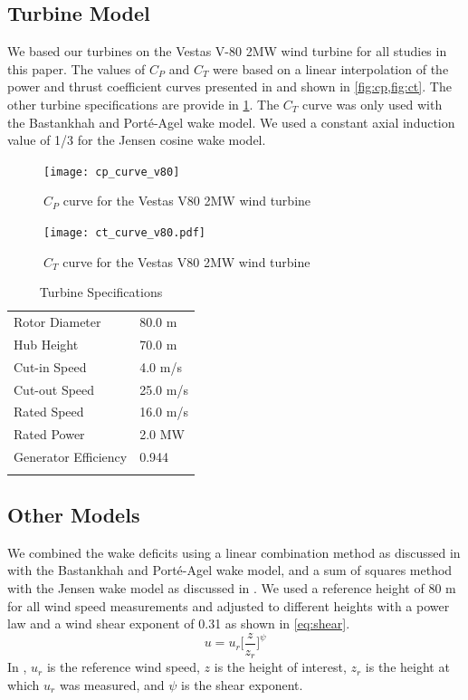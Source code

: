 \documentclass[a4paper]{jpconf}
\begin{document}
\subsection{Turbine Model}
We based our turbines on the Vestas V-80 2MW wind turbine for all studies in this paper. The values of $C_P$ and $C_T$ were based on a linear interpolation of the power and thrust coefficient curves presented in \cite{niayifar2016} and shown in \cref{fig:cp,fig:ct}. The other turbine specifications are provide in \cref{tab:v80}. The $C_T$ curve was only used with the Bastankhah and Port\'e-Agel wake model. We used a constant axial induction value of 1/3 for the Jensen cosine wake model.
%
\begin{figure}[htp]
	\centering
	\begin{minipage}[t]{0.48\textwidth}
		\centering
		\texttt{[image: cp\_curve\_v80]}
		\caption{$C_P$ curve for the Vestas V80 2MW wind turbine \cite{niayifar2016} }
		\label{fig:cp}
	\end{minipage}\hspace{1pc}%
	\begin{minipage}[t]{0.48\textwidth}
		\centering
		\texttt{[image: ct\_curve\_v80.pdf]}
		\caption{$C_T$ curve for the Vestas V80 2MW wind turbine \cite{niayifar2016}}
		\label{fig:ct}
	\end{minipage} 
\end{figure}
%
\begin{table}
	\caption{Turbine Specifications}
	\label{tab:v80}
	\centering
	\begin{tabular}{l l}
		\br
		Rotor Diameter & 80.0 m\\
		Hub Height & 70.0 m \\
		Cut-in Speed & 4.0 m/s\\
		Cut-out Speed & 25.0 m/s \\
		Rated Speed & 16.0 m/s \\
		Rated Power & 2.0 MW \\
		Generator Efficiency & 0.944 \\
		\br
	\end{tabular}
\end{table}

\subsection{Other Models}
We combined the wake deficits using a linear combination method as discussed in \cite{niayifar2016} with the Bastankhah and Port\'e-Agel wake model, and a sum of squares method with the Jensen wake model as discussed in \cite{katic1986}. We used a reference height of 80 m for all wind speed measurements and adjusted to different heights with a power law and a wind shear exponent of 0.31 as shown in \cref{eq:shear}. 
%
\begin{equation} \label{eq:shear}
u = u_r\bigg[\frac{z}{z_r}\bigg]^\psi
\end{equation}
%
In , $u_r$ is the reference wind speed, $z$ is the height of interest, $z_r$ is the height at which $u_r$ was measured, and $\psi$ is the shear exponent.
\end{document}
